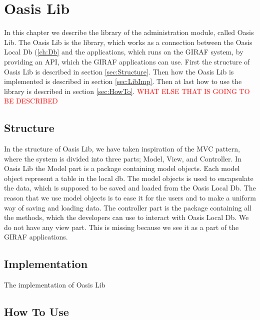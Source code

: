 \chapter{Oasis Lib}
\label{ch:Lib}
In this chapter we describe the library of the administration module, called Oasis Lib. The Oasis Lib is the library, which works as a connection between the Oasis Local Db (\vref{ch:Db} and the applications, which runs on the GIRAF system, by providing an API, which the GIRAF applications can use. First the structure of Oasis Lib is described in section \vref{sec:Structure}. Then how the Oasis Lib is implemented is described in section \vref{sec:LibImp}. Then at last how to use the library is described in section \vref{sec:HowTo}. \textcolor{red}{WHAT ELSE THAT IS GOING TO BE DESCRIBED}

\section{Structure}
\label{sec:Structure}
In the structure of Oasis Lib, we have taken inspiration of the MVC pattern, where the system is divided into three parts; Model, View, and Controller. In Oasis Lib the Model part is a package containing model objects. Each model object represent a table in the local db. The model objects is used to encapsulate the data, which is supposed to be saved and loaded from the Oasis Local Db. The reason that we use model objects is to ease it for the users and to make a uniform way of saving and loading data. The controller part is the package containing all the methods, which the developers can use to interact with Oasis Local Db. We do not have any view part. This is missing because we see it as a part of the GIRAF applications.

\section{Implementation}
\label{sec:LibImp}
The implementation of Oasis Lib

\section{How To Use}
\label{sec:HowTo}